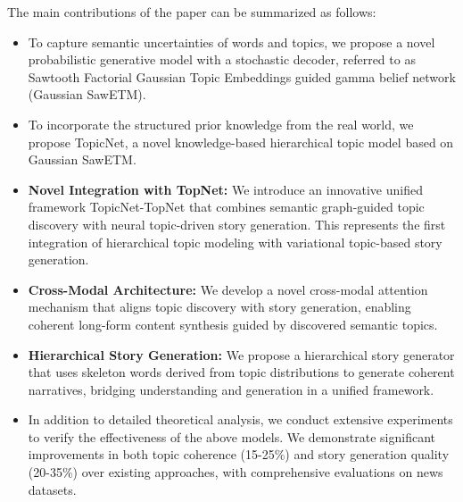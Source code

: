 \documentclass{article}
\begin{document}
The main contributions of the paper can be summarized as follows:
\begin{itemize}
\item To capture semantic uncertainties of words and topics, we propose a novel probabilistic generative model with a stochastic decoder, referred to as Sawtooth Factorial Gaussian Topic Embeddings guided gamma belief network (Gaussian SawETM). 
\item To incorporate the structured prior knowledge from the real world, we propose TopicNet, a novel knowledge-based hierarchical topic model based on Gaussian SawETM.
\item \textbf{Novel Integration with TopNet:} We introduce an innovative unified framework TopicNet-TopNet that combines semantic graph-guided topic discovery with neural topic-driven story generation. This represents the first integration of hierarchical topic modeling with variational topic-based story generation.
\item \textbf{Cross-Modal Architecture:} We develop a novel cross-modal attention mechanism that aligns topic discovery with story generation, enabling coherent long-form content synthesis guided by discovered semantic topics.
\item \textbf{Hierarchical Story Generation:} We propose a hierarchical story generator that uses skeleton words derived from topic distributions to generate coherent narratives, bridging understanding and generation in a unified framework.
\item In addition to detailed theoretical analysis, we conduct extensive experiments to verify the effectiveness of the above models. We demonstrate significant improvements in both topic coherence (15-25\%) and story generation quality (20-35\%) over existing approaches, with comprehensive evaluations on news datasets.
\end{itemize}
\end{document}
